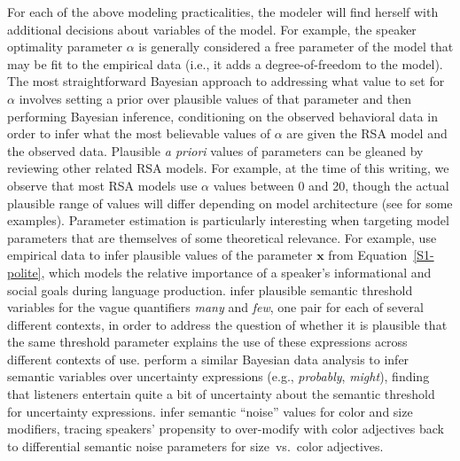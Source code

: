 \documentclass{sp}
\begin{document}
For each of the above modeling practicalities, the modeler will find herself with additional decisions about variables of the model. For example, the speaker optimality parameter $\alpha$ is generally considered a free parameter of the model that may be fit to the empirical data (i.e., it adds a degree-of-freedom to the model). The most straightforward Bayesian approach to addressing what value to set for $\alpha$ involves setting a prior over plausible values of that parameter and then performing Bayesian inference, conditioning on the observed behavioral data in order to infer what  the most believable values of $\alpha$ are given the RSA model and the observed data.
Plausible \emph{a priori} values of parameters can be gleaned by reviewing other related RSA models. For example, at the time of this writing, we observe that most RSA models use $\alpha$ values between 0 and 20, though the actual plausible range of values will differ depending on model architecture (see \citealp{tesslergoodman2019, yoonetal2020} for some examples).
Parameter estimation is particularly interesting when targeting model parameters that are themselves of some theoretical relevance.
For example, \citet{yoonetal2016} use empirical data to infer plausible values of the parameter $\textbf{x}$ from Equation~\eqref{S1-polite}, which models the relative importance of a speaker's informational and social goals during language production.
\citet{FrankeScholler2016:Semantic-values} infer plausible semantic threshold variables for the vague quantifiers \emph{many} and \emph{few}, one pair for each of several different contexts, in order to address the question of whether it is plausible that the same threshold parameter explains the use of these expressions across different contexts of use.
\citet{schuster2020know} perform a similar Bayesian data analysis to infer semantic variables over uncertainty expressions (e.g., \emph{probably}, \emph{might}), finding that listeners entertain quite a bit of uncertainty about the semantic threshold for uncertainty expressions. \citet{degenetal2020} infer semantic ``noise'' values for color and size modifiers, tracing speakers' propensity to over-modify with color adjectives back to differential semantic noise parameters for size~vs.~color adjectives. 
\end{document}
